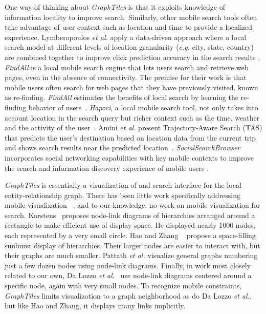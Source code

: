 One way of thinking about \textit{GraphTiles} is that it exploits knowledge of information locality to improve search. Similarly, other mobile search tools often take advantage of user context such as location and time to provide a localized experience. Lymberopoulos \textit{et al.} apply a data-driven approach where a local search model at different levels of location granularity (\textit{e.g.} city, state, country) are combined together to improve click prediction accuracy in the search results \cite{Lymberopoulos:2011}. \textit{FindAll} is a local mobile search engine that lets users search and retrieve web pages, even in the absence of connectivity. The premise for their work is that mobile users often search for web pages that they have previously visited, known as re-finding. \textit{FindAll} estimates the benefits of local search by learning the re-finding behavior of users~\cite{Balasubramanian:2012}. \textit{Hapori}, a local mobile search tool,  not only takes into account location in the search query but richer context such as the time, weather and the activity of the user~\cite{Lane:2010}. Amini \textit{et al.} present Trajectory-Aware Search (TAS) that predicts the user's destination based on location data from the current trip and shows search results near the predicted location~\cite{Amini:2012}. \textit{SocialSearchBrowser} incorporates social networking capabilities with key mobile contexts to improve the search and information discovery experience of mobile users \cite{Church:2010}.

\textit{GraphTiles} is essentially a visualization of and search interface for the local entity-relationship graph. There has been little work specifically addressing mobile visualization ~\cite{RefWorks:658}, and to our knowledge, no work on mobile visualization for search. Karstens~\cite{RefWorks:908} proposes node-link diagrams of hierarchies arranged around a rectangle to make efficient use of display space. He displayed nearly 1000 nodes, each represented by a very small circle. Hao and Zhang ~\cite{RefWorks:906} propose a space-filling sunburst display of hierarchies. Their larger nodes are easier to interact with, but their graphs are much smaller. Pattath \textit{et al.}  \cite{RefWorks:896} visualize general graphs numbering just a few dozen nodes using node-link diagrams. Finally, in work most closely related to our own, Da Lozzo \textit{et al.}~\cite{springerlink:10.1007/978-3-642-18469-7-14} use node-link diagrams centered around a specific node, again with very small nodes. To recognize mobile constraints, \textit{GraphTiles} limits visualization to a graph neighborhood as do Da Lozzo \textit{et al.}, but like Hao and Zhang, it displays many links implicitly.
